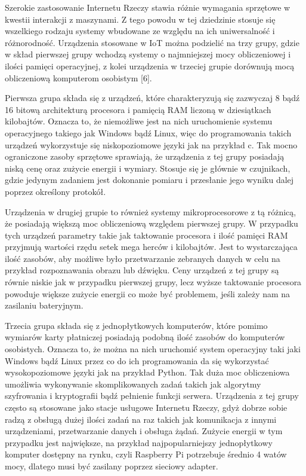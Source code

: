 \documentclass[12pt, twoside, openany]{mwrep}
\begin{document}
Szerokie zastosowanie Internetu Rzeczy stawia różnie wymagania sprzętowe w kwestii interakcji z maszynami. Z tego powodu w tej dziedzinie stosuje się wszelkiego rodzaju systemy wbudowane ze względu na ich uniwersalność i różnorodność.  Urządzenia stosowane w IoT można podzielić na trzy grupy, gdzie w skład pierwszej grupy wchodzą systemy o najmniejszej mocy obliczeniowej i ilości pamięci operacyjnej, z kolei urządzenia w trzeciej grupie dorównują mocą obliczeniową komputerom osobistym [6]. 
\par
Pierwsza grupa składa się z urządzeń, które charakteryzują się zazwyczaj 8 bądź 16 bitową architekturą procesora i pamięcią RAM liczoną w dziesiątkach kilobajtów. Oznacza to, że niemożliwe jest na nich uruchomienie systemu operacyjnego takiego jak Windows bądź Linux, więc do programowania takich urządzeń wykorzystuje się niskopoziomowe języki jak na przykład c. Tak mocno ograniczone zasoby sprzętowe sprawiają, że urządzenia z tej grupy posiadają niską cenę oraz zużycie energii i wymiary. Stosuje się je głównie w czujnikach, gdzie jedynym zadaniem jest dokonanie pomiaru i przesłanie jego wyniku dalej poprzez określony protokół. 
\par
Urządzenia w drugiej grupie to również systemy mikroprocesorowe z tą różnicą, że posiadają większą moc obliczeniową względem pierwszej grupy. W przypadku tych urządzeń parametry takie jak taktowanie procesora i ilość pamięci RAM przyjmują wartości rzędu setek mega herców i kilobajtów. Jest to wystarczająca ilość zasobów, aby możliwe było przetwarzanie zebranych danych w celu na przykład rozpoznawania obrazu lub dźwięku. Ceny urządzeń z tej grupy są równie niskie jak w przypadku pierwszej grupy, lecz wyższe taktowanie procesora powoduje większe zużycie energii co może być problemem, jeśli zależy nam na zasilaniu bateryjnym.
\par
Trzecia grupa składa się z jednopłytkowych komputerów, które pomimo wymiarów karty płatniczej posiadają podobną ilość zasobów do komputerów osobistych.  Oznacza to, że można na nich uruchomić system operacyjny taki jaki Windows bądź Linux przez co do ich programowania da się wykorzystać wysokopoziomowe języki jak na przykład Python. Tak duża moc obliczeniowa umożliwia wykonywanie skomplikowanych zadań takich jak algorytmy szyfrowania i kryptografii bądź pełnienie funkcji serwera. Urządzenia z tej grupy często są stosowane jako stacje usługowe Internetu Rzeczy, gdyż dobrze sobie radzą z obsługą dużej ilości zadań na raz takich jak komunikacja z innymi urządzeniami, przetwarzanie danych i obsługa żądań. Zużycie energii w tym przypadku jest największe, na przykład najpopularniejszy jednopłytkowy komputer dostępny na rynku, czyli Raspberry Pi potrzebuje średnio 4 watów mocy, dlatego musi być zasilany poprzez sieciowy adapter.
\end{document}
